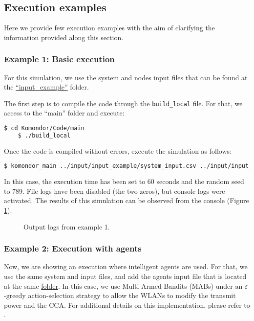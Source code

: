 \documentclass[a4paper]{article}
\begin{document}
\subsection{Execution examples}
\label{section:examples}
Here we provide few execution examples with the aim of clarifying the information provided along this section.

\subsubsection{Example 1: Basic execution}
For this simulation, we use the system and nodes input files that can be found at the \href{https://github.com/wn-upf/Komondor/tree/master/Code/input/input_example}{``input\_example''} folder.

The first step is to compile the code through the \texttt{build\_local} file. For that, we access to the ``main'' folder and execute:
\begin{lstlisting}[language=bash,caption={Compling the code}]
	$ cd Komondor/Code/main
	$ ./build_local
\end{lstlisting}

Once the code is compiled without errors, execute the simulation as follows:
\begin{lstlisting}[language=bash,caption={Executing the code}]
$ komondor_main ../input/input_example/system_input.csv ../input/input_example/nodes_input.csv 0 0 1 1 60 789
\end{lstlisting}

In this case, the execution time has been set to 60 seconds and the random seed to 789. File logs have been disabled (the two zeros), but console logs were activated. The results of this simulation can be observed from the console (Figure \ref{fig:example_1_console_output}).

\begin{figure}[h!]
	\centering
	\caption{Output logs from example 1.}
	\label{fig:example_1_console_output}
\end{figure}

\subsubsection{Example 2: Execution with agents}
Now, we are showing an execution where intelligent agents are used. For that, we use the same system and input files, and add the agents input file that is located at the same \href{https://github.com/wn-upf/Komondor/tree/master/Code/input/input_example}{folder}. In this case, we use Multi-Armed Bandits (MABs) under an $\varepsilon$-greedy action-selection strategy to allow the WLANs to modify the transmit power and the CCA. For additional details on this implementation, please refer to \cite{wilhelmi2017collaborative}.
\end{document}
